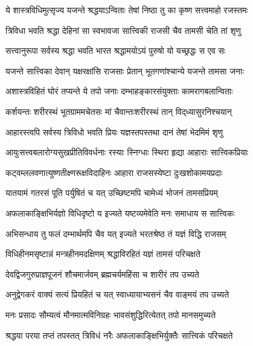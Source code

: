 \twolineshloka
{ये शास्त्रविधिमुत्सृज्य यजन्ते श्रद्धयाऽन्विताः}
{तेषां निष्ठा तु का कृष्ण सत्त्वमाहो रजस्तमः}%

\twolineshloka
{त्रिविधा भवति श्रद्धा देहिनां सा स्वभावजा}
{सात्त्विकी राजसी चैव तामसी चेति तां शृणु}%

\twolineshloka
{सत्त्वानुरूपा सर्वस्य श्रद्धा भवति भारत}
{श्रद्धामयोऽयं पुरुषो यो यच्छ्रद्धः स एव सः}%

\twolineshloka
{यजन्ते सात्त्विका देवान् यक्षरक्षांसि राजसाः}
{प्रेतान् भूतगणांश्चान्ये यजन्ते तामसा जनाः}%

\twolineshloka
{अशास्त्रविहितं घोरं तप्यन्ते ये तपो जनाः}
{दम्भाहङ्कारसंयुक्ताः कामरागबलान्विताः}%

\twolineshloka
{कर्शयन्तः शरीरस्थं भूतग्राममचेतसः}
{मां चैवान्तःशरीरस्थं तान् विद्‌ध्यासुरनिश्चयान्}%

\twolineshloka
{आहारस्त्वपि सर्वस्य त्रिविधो भवति प्रियः}
{यज्ञस्तपस्तथा दानं तेषां भेदमिमं शृणु}%

\twolineshloka
{आयुःसत्त्वबलारोग्यसुखप्रीतिविवर्धनाः}
{रस्याः स्निग्धाः स्थिरा हृद्या आहाराः सात्त्विकप्रियाः}%

\twolineshloka
{कट्वम्ललवणात्युष्णतीक्ष्णरूक्षविदाहिनः}
{आहारा राजसस्येष्टा दुःखशोकामयप्रदाः}%

\twolineshloka
{यातयामं गतरसं पूति पर्युषितं च यत्}
{उच्छिष्टमपि चामेध्यं भोजनं तामसप्रियम्}%

\twolineshloka
{अफलाकाङ्क्षिभिर्यज्ञो विधिदृष्टो य इज्यते}
{यष्टव्यमेवेति मनः समाधाय स सात्त्विकः}%

\twolineshloka
{अभिसन्धाय तु फलं दम्भार्थमपि चैव यत्}
{इज्यते भरतश्रेष्ठ तं यज्ञं विद्धि राजसम्}%

\twolineshloka
{विधिहीनमसृष्टान्नं मन्त्रहीनमदक्षिणम्}
{श्रद्धाविरहितं यज्ञं तामसं परिचक्षते}%

\twolineshloka
{देवद्विजगुरुप्राज्ञपूजनं शौचमार्जवम्}
{ब्रह्मचर्यमहिंसा च शारीरं तप उच्यते}%

\twolineshloka
{अनुद्वेगकरं वाक्यं सत्यं प्रियहितं च यत्}
{स्वाध्यायाभ्यसनं चैव वाङ्मयं तप उच्यते}%

\twolineshloka
{मनः प्रसादः सौम्यत्वं मौनमात्मविनिग्रहः}
{भावसंशुद्धिरित्येतत् तपो मानसमुच्यते}%

\twolineshloka
{श्रद्धया परया तप्तं तपस्तत् त्रिविधं नरैः}
{अफलाकाङ्क्षिभिर्युक्तैः सात्त्विकं परिचक्षते}%

